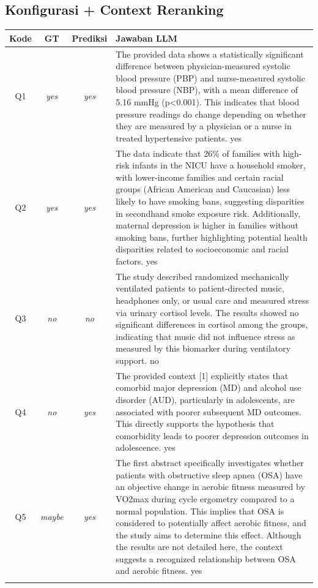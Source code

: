 \subsection*{Konfigurasi + Context Reranking}
\begin{longtable}{@{}c c c >{\raggedright\arraybackslash}p{8.8cm}@{}}
\toprule
\textbf{Kode} & \textbf{GT} & \textbf{Prediksi} & \textbf{Jawaban LLM} \\
\midrule\endhead
Q1 & \textit{yes} & \textit{yes} & The provided data shows a statistically significant difference between physician-measured systolic blood pressure (PBP) and nurse-measured systolic blood pressure (NBP), with a mean difference of 5.16 mmHg (p<0.001). This indicates that blood pressure readings do change depending on whether they are measured by a physician or a nurse in treated hypertensive patients. yes \\
\addlinespace
Q2 & \textit{yes} & \textit{yes} & The data indicate that 26\% of families with high-risk infants in the NICU have a household smoker, with lower-income families and certain racial groups (African American and Caucasian) less likely to have smoking bans, suggesting disparities in secondhand smoke exposure risk. Additionally, maternal depression is higher in families without smoking bans, further highlighting potential health disparities related to socioeconomic and racial factors. yes \\
\addlinespace
Q3 & \textit{no} & \textit{no} & The study described randomized mechanically ventilated patients to patient-directed music, headphones only, or usual care and measured stress via urinary cortisol levels. The results showed no significant differences in cortisol among the groups, indicating that music did not influence stress as measured by this biomarker during ventilatory support. no \\
\addlinespace
Q4 & \textit{no} & \textit{yes} & The provided context [1] explicitly states that comorbid major depression (MD) and alcohol use disorder (AUD), particularly in adolescents, are associated with poorer subsequent MD outcomes. This directly supports the hypothesis that comorbidity leads to poorer depression outcomes in adolescence. yes \\
\addlinespace
Q5 & \textit{maybe} & \textit{yes} & The first abstract specifically investigates whether patients with obstructive sleep apnea (OSA) have an objective change in aerobic fitness measured by VO2max during cycle ergometry compared to a normal population. This implies that OSA is considered to potentially affect aerobic fitness, and the study aims to determine this effect. Although the results are not detailed here, the context suggests a recognized relationship between OSA and aerobic fitness. yes \\
\addlinespace
\bottomrule
\end{longtable}

